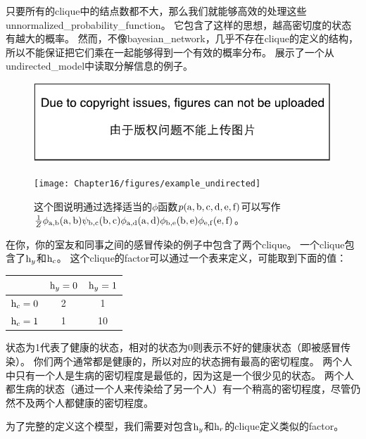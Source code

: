 只要所有的\gls{clique}中的结点数都不大，那么我们就能够高效的处理这些\gls{unnormalized_probability_function}。
它包含了这样的思想，越高密切度的状态有越大的概率。
然而，不像\gls{bayesian_network}，几乎不存在\gls{clique}的定义的结构，所以不能保证把它们乘在一起能够得到一个有效的概率分布。
展示了一个从\gls{undirected_model}中读取分解信息的例子。

\begin{figure}[!htb]
\ifOpenSource
\centerline{\includegraphics{figure.pdf}}
\else
	\centerline{\texttt{[image: Chapter16/figures/example\_undirected]}}
\fi
	\caption{这个图说明通过选择适当的$\phi$函数$p(\mathrm{a},\mathrm{b},\mathrm{c},\mathrm{d},\mathrm{e},\mathrm{f})$可以写作$\frac{1}{Z}\phi_{\mathrm{a},\mathrm{b}}(\mathrm{a},\mathrm{b})\psi_{\mathrm{b},\mathrm{c}}(\mathrm{b},\mathrm{c})\phi_{\mathrm{a},\mathrm{d}}(\mathrm{a},\mathrm{d})\phi_{\mathrm{b},\mathrm{e}}(\mathrm{b},\mathrm{e})\phi_{\mathrm{e},\mathrm{f}}(\mathrm{e},\mathrm{f})$。}
	\label{fig:example_undirected}
\end{figure}



在你，你的室友和同事之间的感冒传染的例子中包含了两个\gls{clique}。
一个\gls{clique}包含了$\mathrm{h}_y$和$\mathrm{h}_c$。
这个\gls{clique}的\gls{factor}可以通过一个表来定义，可能取到下面的值：

\begin{tabular}{c|cc}
		& $\mathrm{h}_y = 0$ & $\mathrm{h}_y = 1$ \\ \hline
		$\mathrm{h}_c = 0$ & 2 & 1 \\
		$\mathrm{h}_c = 1$  & 1 & 10 \\
\end{tabular}


状态为1代表了健康的状态，相对的状态为0则表示不好的健康状态（即被感冒传染）。
你们两个通常都是健康的，所以对应的状态拥有最高的密切程度。
两个人中只有一个人是生病的密切程度是最低的，因为这是一个很少见的状态。
两个人都生病的状态（通过一个人来传染给了另一个人）有一个稍高的密切程度，尽管仍然不及两个人都健康的密切程度。


为了完整的定义这个模型，我们需要对包含$\mathrm{h}_y$和$\mathrm{h}_r$的\gls{clique}定义类似的\gls{factor}。


